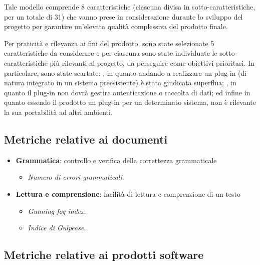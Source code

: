 Tale modello comprende 8 caratteristiche (ciascuna divisa in sotto-caratteristiche, per un totale di 31) che vanno prese in considerazione durante lo sviluppo del progetto per garantire un'elevata qualità complessiva del prodotto finale.

Per praticità e rilevanza ai fini del prodotto, sono state selezionate 5 caratteristiche da considerare e per ciascuna sono state individuate le sotto-caratteristiche più rilevanti al progetto, da perseguire come obiettivi prioritari. In particolare, sono state scartate: , in quanto andando a realizzare un plug-in (di natura integrato in un sistema preesistente) è stata giudicata superflua; , in quanto il plug-in non dovrà gestire autenticazione o raccolta di dati; ed infine  in quanto essendo il prodotto un plug-in per un determinato sistema, non è rilevante la sua portabilità ad altri ambienti. 

\subsection{Metriche relative ai documenti}

\begin{itemize}
	\item{\textbf{Grammatica}: controllo e verifica della correttezza grammaticale
		\begin{itemize}
			\item{\emph{Numero di errori grammaticali}.}
		\end{itemize}	
	}
	\item{\textbf{Lettura e comprensione}: facilità di lettura e comprensione di un testo
		\begin{itemize}
			\item{\emph{Gunning fog index}.}
			\item{\emph{Indice di Gulpease}.}
		\end{itemize}	
	}
\end{itemize}

\subsection{Metriche relative ai prodotti software}

